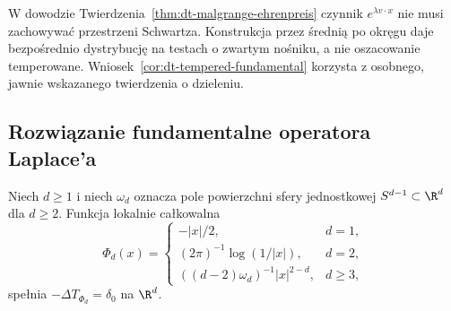 \begin{uwaga}
W dowodzie Twierdzenia~\ref{thm:dt-malgrange-ehrenpreis}
czynnik $e^{\lambda v\cdot x}$ nie musi zachowywać
przestrzeni Schwartza. Konstrukcja przez średnią
po okręgu daje bezpośrednio dystrybucję na testach
o zwartym nośniku, a nie oszacowanie temperowane.
Wniosek~\ref{cor:dt-tempered-fundamental} korzysta
z osobnego, jawnie wskazanego twierdzenia o dzieleniu.
\end{uwaga}

\subsection{Rozwiązanie fundamentalne operatora Laplace'a}
\begin{twierdzenie}
\label{thm:dt-laplace}
Niech $d\ge1$ i niech $\omega_d$ oznacza pole powierzchni
sfery jednostkowej $S^{d-1}\subset\R^d$ dla $d\ge2$.
Funkcja lokalnie całkowalna
\begin{equation}\label{eq:dt-laplace-fundamental}
 \Phi_d(x)=\begin{cases}
 -|x|/2,&d=1,\\
 (2\pi)^{-1}\log(1/|x|),&d=2,\\
 ((d-2)\omega_d)^{-1}|x|^{2-d},&d\ge3,
 \end{cases}
\end{equation}
spełnia $-\Delta T_{\Phi_d}=\delta_0$ na $\R^d$.
\end{twierdzenie}
